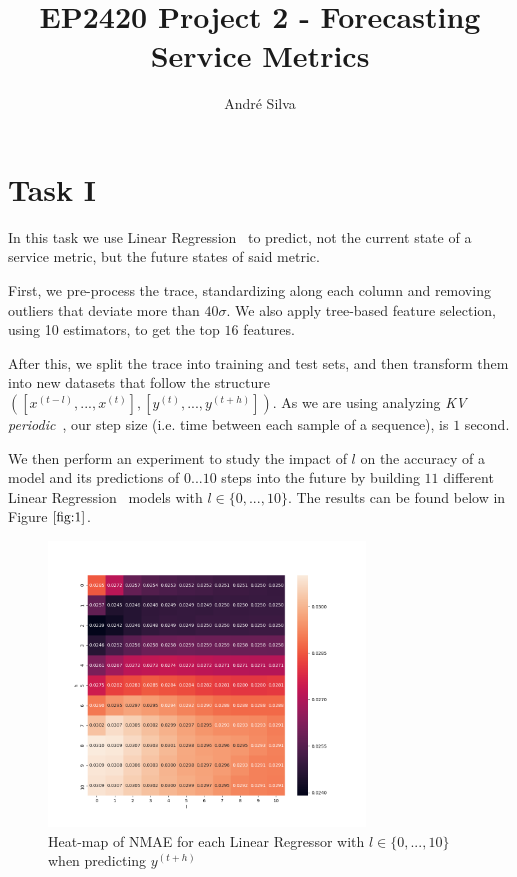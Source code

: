 \documentclass[10pt]{article}
\title{EP2420 Project 2 - Forecasting Service Metrics}
\author{André Silva}
\begin{document}
\maketitle

\section*{Task I}
\label{sec:1}

In this task we use Linear Regression~\cite{LR} to predict, not the current state of a service metric, but the future states of said metric.

First, we pre-process the trace, standardizing along each column and removing outliers that deviate more than $40\sigma$. We also apply tree-based feature selection, using 10 estimators, to get the top $16$ features.

After this, we split the trace into training and test sets, and then transform them into new datasets that follow the structure $([x^{(t-l)},...,x^{(t)}],[y^{(t)},...,y^{(t+h)}])$. As we are using analyzing \textit{KV periodic}~\cite{9012741}, our step size (i.e. time between each sample of a sequence), is $1$ second.

We then perform an experiment to study the impact of $l$ on the accuracy of a model and its predictions of $0...10$ steps into the future by building $11$ different Linear Regression~\cite{LR} models with $l\in\{0,...,10\}$. The results can be found below in Figure $\ref{fig:1}$.

\begin{figure}[h!]
    \centering
    \includegraphics[width=0.75\textwidth,height=\textheight,keepaspectratio]{../result/project2/nmae_heatmap.png}
    \caption{Heat-map of \textsc{NMAE} for each Linear Regressor with $l\in\{0,...,10\}$ when predicting $y^{(t+h)}$}
    \label{fig:1}
\end{figure}
\end{document}
